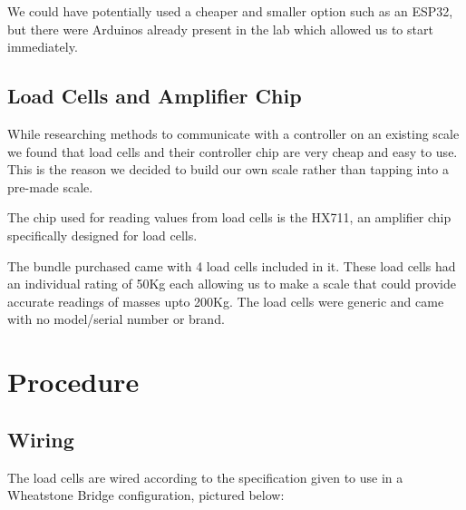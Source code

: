 \documentclass[10pt]{article}
\begin{document}
{\begin{flushleft}
{We could have potentially used a cheaper and smaller option such as an ESP32, but there were Arduinos already present in the lab which allowed us to start immediately.

{\large\subsection{Load Cells and Amplifier Chip}\par}
While researching methods to communicate with a controller on an existing scale we found that load cells and their controller chip are very cheap and easy to use. This is the reason we decided to build our own scale rather than tapping into a pre-made scale.

The chip used for reading values from load cells is the HX711, an amplifier chip specifically designed for load cells.

The bundle purchased came with 4 load cells included in it. These load cells had an individual rating of 50Kg each allowing us to make a scale that could provide accurate readings of masses upto 200Kg. The load cells were generic and came with no model/serial number or brand.


\par}
{\newpage\Large\section{Procedure}\par}
{\large
{\large\subsection{Wiring}\par}
The load cells are wired according to the specification given to use in a Wheatstone Bridge configuration, pictured below:

}
\end{flushleft}}
\end{document}
